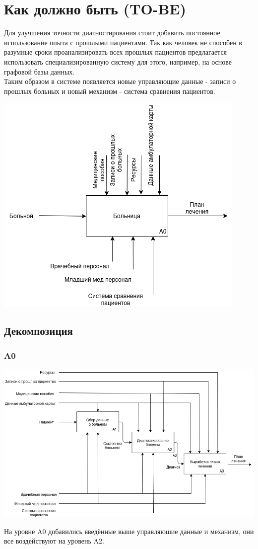 \documentclass[a4paper, 12pt]{article}
\begin{document}
\section{Как должно быть (TO-BE)}
Для улучшения точности диагностирования стоит добавить постоянное использование опыта с прошлыми пациентами. Так как человек не способен в разумные сроки проанализировать всех прошлых пациентов предлагается использовать специализированную систему для этого, например, на основе графовой базы данных.\\
Таким образом в системе появляется новые управляющие данные - записи о прошлых больных и новый механизм - система сравнения пациентов.
\begin{center}
  \centering
  \includegraphics[width=.7\linewidth]{extra/to-be_context.png}
  \label{fig:prplot}
\end{center}
\subsection{Декомпозиция}
\subsubsection{A0}
\begin{center}
  \centering
  \includegraphics[width=.7\linewidth]{extra/to-be_A0.png}
  \label{fig:prplot}
\end{center}
На уровне A0 добавились введённые выше управляюшие данные и механизм, они все воздействуют на уровень A2.
\end{document}
